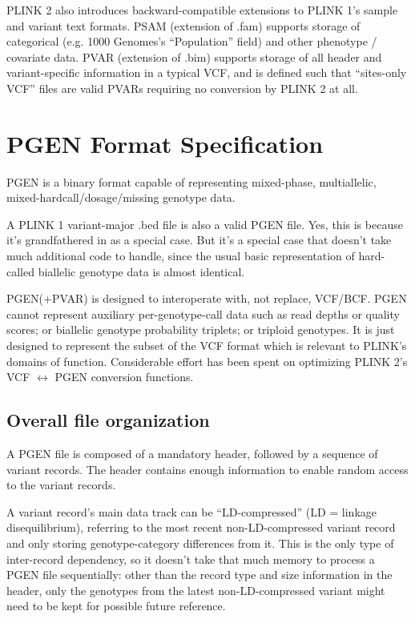 \documentclass[8pt]{article}
\begin{document}
PLINK 2 also introduces backward-compatible extensions to PLINK 1's sample and
variant text formats.  PSAM (extension of .fam) supports storage of categorical
(e.g. 1000 Genomes's ``Population'' field) and other phenotype / covariate
data.  PVAR (extension of .bim) supports storage of all header and
variant-specific information in a typical VCF, and is defined such that
``sites-only VCF'' files are valid PVARs requiring no conversion by PLINK 2 at
all.

\newpage
\section{PGEN Format Specification}

PGEN is a binary format capable of representing mixed-phase, multiallelic,
mixed-hardcall/dosage/missing genotype data.

A PLINK 1 variant-major .bed file is also a valid PGEN file.  Yes, this is
because it's grandfathered in as a special case.  But it's a special case that
doesn't take much additional code to handle, since the usual basic
representation of hard-called biallelic genotype data is almost identical.

PGEN(+PVAR) is designed to interoperate with, not replace, VCF/BCF.  PGEN
cannot represent auxiliary per-genotype-call data such as read depths or
quality scores; or biallelic genotype probability triplets; or triploid
genotypes.  It is just designed to represent the subset of the VCF format which
is relevant to PLINK's domains of function.  Considerable effort has been spent
on optimizing PLINK 2's VCF $\leftrightarrow$ PGEN conversion functions.

\subsection{Overall file organization}

A PGEN file is composed of a mandatory header, followed by a sequence of
variant records.  The header contains enough information to enable random
access to the variant records.

A variant record's main data track can be ``LD-compressed'' (LD = linkage
disequilibrium), referring to the most recent non-LD-compressed variant record
and only storing genotype-category differences from it.  This is the only type
of inter-record dependency, so it doesn't take that much memory to process a
PGEN file sequentially: other than the record type and size information in the
header, only the genotypes from the latest non-LD-compressed variant might need
to be kept for possible future reference.
\end{document}
